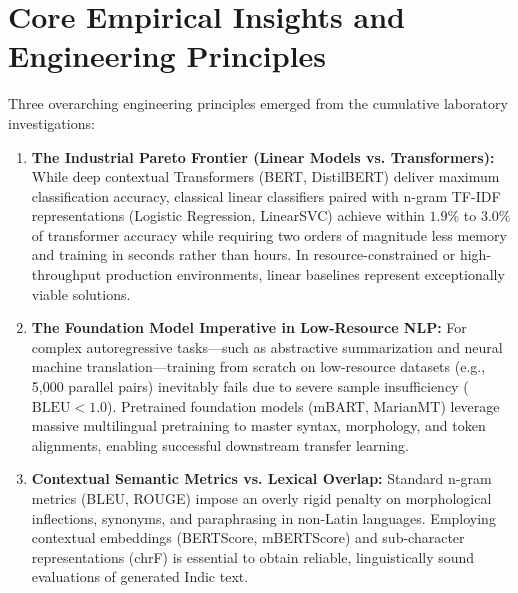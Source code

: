 \documentclass[12pt,a4paper]{report}
\begin{document}
\section{Core Empirical Insights and Engineering Principles}
Three overarching engineering principles emerged from the cumulative laboratory investigations:
\begin{enumerate}
    \item \textbf{The Industrial Pareto Frontier (Linear Models vs. Transformers):} While deep contextual Transformers (BERT, DistilBERT) deliver maximum classification accuracy, classical linear classifiers paired with n-gram TF-IDF representations (Logistic Regression, LinearSVC) achieve within $1.9\%$ to $3.0\%$ of transformer accuracy while requiring two orders of magnitude less memory and training in seconds rather than hours. In resource-constrained or high-throughput production environments, linear baselines represent exceptionally viable solutions.
    \item \textbf{The Foundation Model Imperative in Low-Resource NLP:} For complex autoregressive tasks—such as abstractive summarization and neural machine translation—training from scratch on low-resource datasets (e.g., 5,000 parallel pairs) inevitably fails due to severe sample insufficiency ($\text{BLEU} < 1.0$). Pretrained foundation models (mBART, MarianMT) leverage massive multilingual pretraining to master syntax, morphology, and token alignments, enabling successful downstream transfer learning.
    \item \textbf{Contextual Semantic Metrics vs. Lexical Overlap:} Standard n-gram metrics (BLEU, ROUGE) impose an overly rigid penalty on morphological inflections, synonyms, and paraphrasing in non-Latin languages. Employing contextual embeddings (BERTScore, mBERTScore) and sub-character representations (chrF) is essential to obtain reliable, linguistically sound evaluations of generated Indic text.
\end{enumerate}
\end{document}
